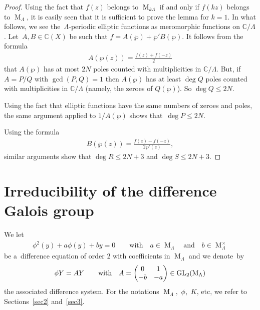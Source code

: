 \documentclass[pdftex]{sigma}
\numberwithin{equation}{section}
\begin{document}
\begin{proof}
Using the fact that $f(z)$ belongs to $\operatorname{M}_{k\Lambda}$ if and only if $f(kz)$ belongs to
$\operatorname{M}_{\Lambda}$, it is easily seen that it is suf\/f\/icient to prove the lemma for $k=1$.
In what follows, we see the~$\Lambda$-periodic elliptic functions as meromorphic functions on $\mathbb C/\Lambda$.
Let~$A,B \in \mathbb C(X)$ be such that $f=A(\wp)+\wp' B(\wp)$.
It follows from the formula
\begin{gather*}
A(\wp(z))=\frac{f(z)+f(-z)}{2}
\end{gather*}
that $A(\wp)$ has at most $2N$ poles counted with multiplicities in $\mathbb C/\Lambda$.
But, if $A=P/Q$ with $\gcd(P,Q)=1$ then $A(\wp)$ has at least $\deg Q$ poles counted with multiplicities in $\mathbb
C/\Lambda$ (namely, the zeroes of $Q(\wp)$).
So $\deg Q \leq 2N$.

Using the fact that elliptic functions have the same numbers of zeroes and poles, the same argument applied to
$1/A(\wp)$ shows that~${\deg P \leq 2N}$.

Using the formula
\begin{gather*}
B(\wp(z))=\frac{f(z)-f(-z)}{2 \wp'(z)},
\end{gather*}
similar arguments show that $\deg R \leq 2N+3$ and $\deg S \leq 2N+3$.
\end{proof}

\section{Irreducibility of the dif\/ference Galois group}
\label{sec4}
We let
\begin{gather}
\label{equation d ordre 2}
\phi^{2}(y) + a \phi(y)+by=0 \qquad \text{with} \quad a \in \operatorname{M}_{\Lambda} \quad \text{and} \quad b\in
\operatorname{M}_{\Lambda}^{\times}
\end{gather}
be a~dif\/ference equation of order $2$ with coef\/f\/icients in $\operatorname{M}_{\Lambda}$ and we denote~by
\begin{gather*}
\phi Y=AY \qquad \hbox{with} \quad A=
\begin{pmatrix}
0&1
\\
-b&-a
\end{pmatrix}
\in \operatorname{GL}_{2}(\operatorname{M}_{\Lambda})
\end{gather*}
the associated dif\/ference system.
For the notations $\operatorname{M}_{\Lambda}$,~$\phi$,~$K$, etc, we refer to Sections~\ref{sec2} and~\ref{sec3}.
\end{document}

